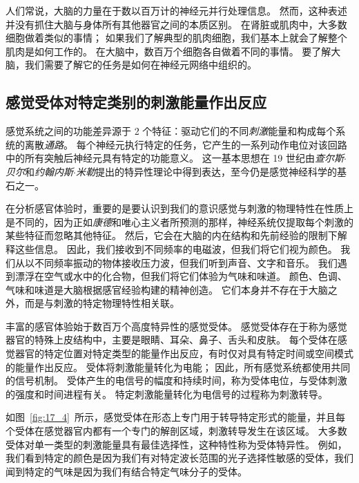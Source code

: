 人们常说，大脑的力量在于数以百万计的神经元并行处理信息。 
然而，这种表述并没有抓住大脑与身体所有其他器官之间的本质区别。 
在肾脏或肌肉中，大多数细胞做着类似的事情； 
如果我们了解典型的肌肉细胞，我们基本上就会了解整个肌肉是如何工作的。 
在大脑中，数百万个细胞各自做着不同的事情。 
要了解大脑，我们需要了解它的任务是如何在神经元网络中组织的。



\subsection{感觉受体对特定类别的刺激能量作出反应}

感觉系统之间的功能差异源于 2 个特征：驱动它们的不同\textit{刺激}能量和构成每个系统的离散\textit{通路}。
每个神经元执行特定的任务，它产生的一系列动作电位对该回路中的所有突触后神经元具有特定的功能意义。 
这一基本思想在 19 世纪由\textit{查尔斯$\cdot$贝尔}和\textit{约翰内斯$\cdot$米勒}提出的特异性理论中得到表达，至今仍是感觉神经科学的基石之一。


在分析感官体验时，重要的是要认识到我们的意识感觉与刺激的物理特性在性质上是不同的，因为正如\textit{康德}和唯心主义者所预测的那样，神经系统仅提取每个刺激的某些特征而忽略其他特征。 
然后，它会在大脑的内在结构和先前经验的限制下解释这些信息。 
因此，我们接收到不同频率的电磁波，但我们将它们视为颜色。 
我们从以不同频率振动的物体接收压力波，但我们听到声音、文字和音乐。 
我们遇到漂浮在空气或水中的化合物，但我们将它们体验为气味和味道。 
颜色、色调、气味和味道是大脑根据感官经验构建的精神创造。 
它们本身并不存在于大脑之外，而是与刺激的特定物理特性相关联。


丰富的感官体验始于数百万个高度特异性的感觉受体。 
感觉受体存在于称为感觉器官的特殊上皮结构中，主要是眼睛、耳朵、鼻子、舌头和皮肤。 
每个受体在感觉器官的特定位置对特定类型的能量作出反应，有时仅对具有特定时间或空间模式的能量作出反应。 
受体将刺激能量转化为电能； 
因此，所有感觉系统都使用共同的信号机制。 
受体产生的电信号的幅度和持续时间，称为受体电位，与受体刺激的强度和时间进程有关。
特定刺激能量转化为电信号的过程称为刺激转导。


如图~\ref{fig:17_4}~所示，感觉受体在形态上专门用于转导特定形式的能量，并且每个受体在感觉器官内都有一个专门的解剖区域，刺激转导发生在该区域。 
大多数受体对单一类型的刺激能量具有最佳选择性，这种特性称为受体特异性。
例如，我们看到特定的颜色是因为我们有对特定波长范围的光子选择性敏感的受体，我们闻到特定的气味是因为我们有结合特定气味分子的受体。


